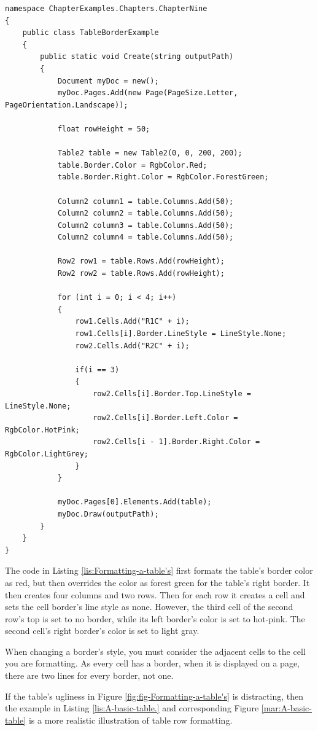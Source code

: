 \documentclass[american,letterpaper]{tufte-book}
\numberwithin{equation}{section}
\numberwithin{figure}{section}
\begin{document}
{\begin{lstlisting}[caption={Formatting a table's borders.},label={lis:Formatting-a-table's},basicstyle={\small\ttfamily},breaklines=true]
namespace ChapterExamples.Chapters.ChapterNine
{
    public class TableBorderExample
    {
        public static void Create(string outputPath)
        {
            Document myDoc = new();
            myDoc.Pages.Add(new Page(PageSize.Letter, PageOrientation.Landscape));

            float rowHeight = 50;

            Table2 table = new Table2(0, 0, 200, 200);
            table.Border.Color = RgbColor.Red;
            table.Border.Right.Color = RgbColor.ForestGreen;

            Column2 column1 = table.Columns.Add(50);
            Column2 column2 = table.Columns.Add(50);
            Column2 column3 = table.Columns.Add(50);
            Column2 column4 = table.Columns.Add(50);

            Row2 row1 = table.Rows.Add(rowHeight);
            Row2 row2 = table.Rows.Add(rowHeight);

            for (int i = 0; i < 4; i++)
            {
                row1.Cells.Add("R1C" + i);
                row1.Cells[i].Border.LineStyle = LineStyle.None;
                row2.Cells.Add("R2C" + i);

                if(i == 3)
                {
                    row2.Cells[i].Border.Top.LineStyle = LineStyle.None;
                    row2.Cells[i].Border.Left.Color = RgbColor.HotPink;
                    row2.Cells[i - 1].Border.Right.Color = RgbColor.LightGrey;
                }
            }

            myDoc.Pages[0].Elements.Add(table);
            myDoc.Draw(outputPath);
        }
    }
}
\end{lstlisting}
\leavevmode\egroup

The code in Listing \ref{lis:Formatting-a-table's} first formats
the table's border color as red, but then overrides the color as forest
green for the table's right border. It then creates four columns and
two rows. Then for each row it creates a cell and sets the cell border's
line style as none. However, the third cell of the second row's top
is set to no border, while its left border's color is set to hot-pink.
The second cell's right border's color is set to light gray. 

When changing a border's style, you must consider the adjacent cells
to the cell you are formatting. As every cell has a border, when it
is displayed on a page, there are two lines for every border, not
one. 

If the table's ugliness in Figure \ref{fig:fig-Formatting-a-table's}
is distracting, then the example in Listing \ref{lis:A-basic-table.}
and corresponding Figure \ref{mar:A-basic-table} is a more realistic
illustration of table row formatting.

}
\end{document}
